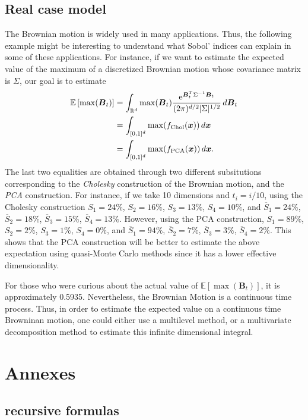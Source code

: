 \documentclass[]{elsarticle}
\theoremstyle{definition}
\newcommand{\bvec}[1]{\boldsymbol{#1}}
\newcommand{\vx}{\bvec{x}}
\begin{document}
\subsection{Real case model}
The Brownian motion is widely used in many applications. Thus, the following example might be interesting to understand what Sobol' indices can explain in some of these applications. For instance, if we want to estimate the expected value of the maximum of a discretized Brownian motion whose covariance matrix is $\Sigma$, our goal is to estimate
\begin{align*}
\mathbb{E} \left[\max(\bvec{B}_t)\right] &= \int_{\mathbb{R}^d} \max(\bvec{B}_t) \frac{{\rm e}^{\bvec{B}_t^T\Sigma^{-1}\bvec{B}_t}}{(2\pi)^{d/2}|\Sigma|^{1/2}}\,d\bvec{B}_t \\
&= \int_{[0,1]^d} \max(f_{\rm Chol}(\vx)) \,d\vx \\
&= \int_{[0,1]^d} \max(f_{\rm PCA}(\vx)) \,d\vx.
\end{align*}
The last two equalities are obtained through two different subsitutions corresponding to the \textit{Cholesky} construction of the Brownian motion, and the \textit{PCA} construction. For instance, if we take 10 dimensions and $t_i=i/10$, using the Cholesky construction $S_{1} = 24\%$, $S_{2} = 16\%$, $S_{3} = 13\%$, $S_{4} = 10\%$, and $\overline{S}_{1}=24\%$, $\overline{S}_{2}=18\%$, $\overline{S}_{3}=15\%$, $\overline{S}_{4} = 13\%$. However, using the PCA construction, $S_{1} = 89\%$, $S_{2} = 2\%$, $S_{3} = 1\%$, $S_{4} = 0\%$, and $\overline{S}_{1}=94\%$, $\overline{S}_{2}=7\%$, $\overline{S}_{3}=3\%$, $\overline{S}_{4} = 2\%$. This shows that the PCA construction will be better to estimate the above expectation using quasi-Monte Carlo methods since it has a lower effective dimensionality.

For those who were curious about the actual value of $\mathbb{E} \left[\max(\bvec{B}_t)\right]$, it is approximately 0.5935. Nevertheless, the Brownian Motion is a continuous time process. Thus, in order to estimate the expected value on a continuous time Browninan motion, one could either use a multilevel method, or a multivariate decomposition method to estimate this infinite dimensional integral.

\newpage
\section{Annexes}

\subsection{recursive formulas}
\label{recursive.formulas}
\end{document}
